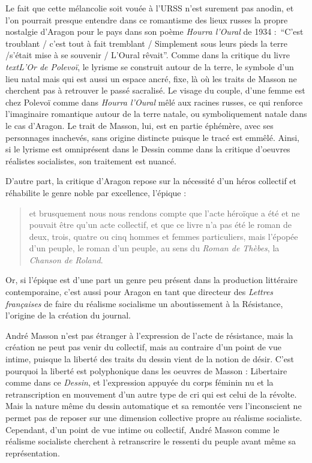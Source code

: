 {Le fait que cette mélancolie soit vouée à l’URSS n’est surement pas anodin, et l’on pourrait presque entendre dans ce romantisme des lieux russes la propre nostalgie d’Aragon pour le pays dans son poème \emph{Hourra l’Oural} de 1934 : \enquote{C’est troublant / c’est tout à fait tremblant / Simplement sous leurs pieds la terre /s’était mise à se souvenir / L’Oural rêvait}. Comme dans la critique du livre \emph{textL’Or de Polevoï}, le lyrisme se construit autour de la terre, le symbole d’un lieu natal mais qui est aussi un espace ancré, fixe, là où les traits de Masson ne cherchent pas à retrouver le passé sacralisé. Le visage du couple, d’une femme est chez Polevoï comme dans \emph{Hourra l’Oural} mêlé aux racines russes, ce qui renforce l’imaginaire romantique autour de la terre natale, ou symboliquement natale dans le cas d’Aragon. Le trait de Masson, lui, est en partie éphémère, avec ses personnages inachevés, sans origine distincte puisque le tracé est emmêlé. Ainsi, si le lyrisme est omniprésent dans le Dessin comme dans la critique d’oeuvres réalistes socialistes, son traitement est nuancé.



	D’autre part, la critique d’Aragon repose sur la nécessité d’un héros collectif et réhabilite le genre noble par excellence, l’épique : 
	\begin{quote}
	et brusquement nous nous rendons compte que l’acte héroïque a été et ne pouvait être qu’un acte collectif, et que ce livre n’a pas été le roman de deux, trois, quatre ou cinq hommes et femmes particuliers, mais l’épopée d’un peuple, le roman d’un peuple, au sens du \emph{Roman de Thèbes}, la \emph{Chanson de Roland}.	
	\end{quote}
	
	
	 Or, si l’épique est d’une part un genre peu présent dans la production littéraire contemporaine, c’est aussi pour Aragon en tant que directeur des \emph{Lettres françaises} de faire du réalisme socialisme un aboutissement à la Résistance, l’origine de la création du journal. 

	André Masson n’est pas étranger à l’expression de l’acte de résistance, mais la création ne peut pas venir du collectif, mais au contraire d’un point de vue intime, puisque la liberté des traits du dessin vient de la notion de désir. C’est pourquoi la liberté est polyphonique dans les oeuvres de Masson : Libertaire comme dans ce \emph{Dessin}, et l’expression appuyée du corps féminin nu et la retranscription en mouvement d’un autre type de cri qui est celui de la révolte. Mais la nature même du dessin automatique et sa remontée vers l’inconscient ne permet pas de reposer sur une dimension collective propre au réalisme socialiste. Cependant, d’un point de vue intime ou collectif, André Masson comme le réalisme socialiste cherchent à retranscrire le ressenti du peuple avant même sa représentation. 

}
